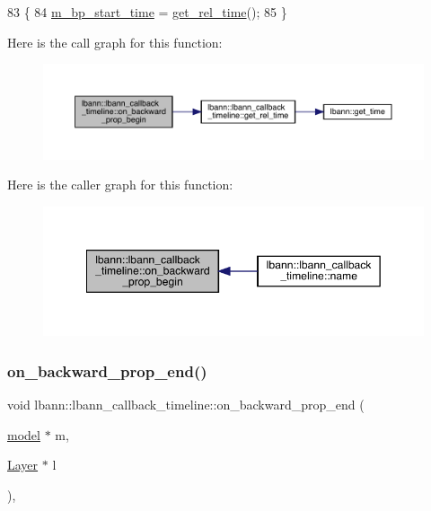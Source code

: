 \begin{DoxyCode}
83                                                                        \{
84   \hyperlink{classlbann_1_1lbann__callback__timeline_a7c4383231990d3a5fc8ec22a93784e15}{m\_bp\_start\_time} = \hyperlink{classlbann_1_1lbann__callback__timeline_a67da1376356bf2153ab67489014e0ad4}{get\_rel\_time}();
85 \}
\end{DoxyCode}
Here is the call graph for this function\+:\nopagebreak
\begin{figure}[H]
\begin{center}
\leavevmode
\includegraphics[width=350pt]{classlbann_1_1lbann__callback__timeline_a81d50e48462765b5e9913ae357b5a412_cgraph}
\end{center}
\end{figure}
Here is the caller graph for this function\+:\nopagebreak
\begin{figure}[H]
\begin{center}
\leavevmode
\includegraphics[width=349pt]{classlbann_1_1lbann__callback__timeline_a81d50e48462765b5e9913ae357b5a412_icgraph}
\end{center}
\end{figure}
\mbox{\label{classlbann_1_1lbann__callback__timeline_a0de42325a96128f7e41ecf8004b99b26}} 
\subsubsection{\texorpdfstring{on\+\_\+backward\+\_\+prop\+\_\+end()}{on\_backward\_prop\_end()}}
{\footnotesize\ttfamily void lbann\+::lbann\+\_\+callback\+\_\+timeline\+::on\+\_\+backward\+\_\+prop\+\_\+end (\begin{DoxyParamCaption}\item[{\hyperlink{classlbann_1_1model}{model} $\ast$}]{m,  }\item[{\hyperlink{classlbann_1_1Layer}{Layer} $\ast$}]{l }\end{DoxyParamCaption})\hspace{0.3cm}{\ttfamily [override]}, {\ttfamily [virtual]}}

